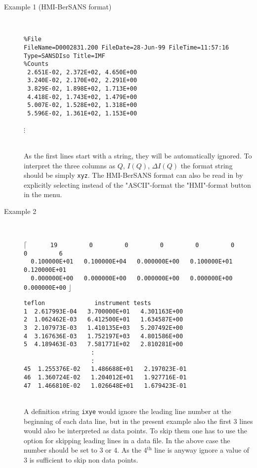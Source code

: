 \begin{description}
\item[Example 1 (HMI-BerSANS format)] ~\\
{\tiny
\begin{verbatim}
%File
FileName=D0002831.200 FileDate=28-Jun-99 FileTime=11:57:16
Type=SANSDIso Title=IMF
%Counts
 2.651E-02, 2.372E+02, 4.650E+00
 3.240E-02, 2.170E+02, 2.291E+00
 3.829E-02, 1.898E+02, 1.713E+00
 4.418E-02, 1.743E+02, 1.479E+00
 5.007E-02, 1.528E+02, 1.318E+00
 5.596E-02, 1.361E+02, 1.153E+00
\end{verbatim}
} \centerline{$\vdots$ \hspace{5cm} ~}
~\\
As the first lines start with a string, they will be automatically
ignored. To interpret the three columns as $Q$, $I(Q)$, $\Delta
I(Q)$ the format string should be simply {\tt xyz}. The HMI-BerSANS
format can also be read in by explicitly selecting instead of the
"ASCII"-format
the "HMI"-format button in the menu. \\[1cm]

\item[Example 2] \hspace{1pt}\\
{\tiny
\textcolor[rgb]{0.98,0.00,0.00}{$\mathbf{\lceil}$}
\verb"      19         0         0         0         0         0         0         6"\\
\verb"  0.100000E+01   0.100000E+04   0.000000E+00   0.100000E+01   0.120000E+01"\\
\verb"  0.000000E+00   0.000000E+00   0.000000E+00   0.000000E+00   0.000000E+00"
\textcolor[rgb]{0.98,0.00,0.00}{$\mathbf{\rfloor}$}
\begin{verbatim}
teflon              instrument tests
1  2.617993E-04   3.700000E+01   4.301163E+00
2  1.062462E-03   6.412500E+01   1.634587E+00
3  2.107973E-03   1.410135E+03   5.207492E+00
4  3.167636E-03   1.752197E+03   4.801586E+00
5  4.189463E-03   7.581771E+02   2.810281E+00
                   :
                   :
45  1.255376E-02   1.486688E+01   2.197023E-01
46  1.360724E-02   1.204012E+01   1.927716E-01
47  1.466810E-02   1.026648E+01   1.679423E-01
\end{verbatim}
}
~\\
A definition string {\tt ixye} would ignore the leading line number
at the beginning of each data line, but in the present example also
the first 3 lines would also be interpreted as data points. To skip
them one has to use the option for skipping leading lines in a data
file. In the above case the number should be set to 3 or 4. As the
4$^\text{th}$ line is anyway ignore a value of 3 is sufficient to
skip non data points.
\\[1cm]


\end{description}
